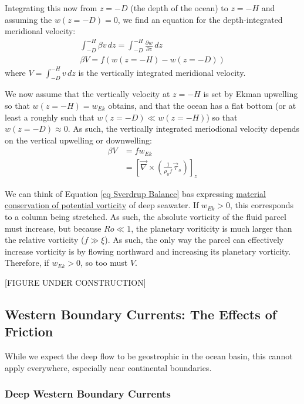 Integrating this now from \(z=-D\) (the depth of the ocean) to \(z=-H\) and assuming the \(w(z=-D)=0\), we find an equation for the depth-integrated meridional velocity:
\begin{align*}
    \int_{-D}^{-H}\beta v\,dz = \int_{-D}^{-H}\frac{\partial w}{\partial z}\,dz
    \\
    \beta V = f\left( w(z=-H)-w(z=-D) \right)
\end{align*}
where \(V=\int_{-D}^{-H} v\,dz\) is the vertically integrated meridional velocity.

We now assume that the vertically velocity at \(z=-H\) is set by Ekman upwelling so that \(w(z=-H)=w_{Ek}\) obtains, and that the ocean has a flat bottom (or at least a roughly such that \(w(z=-D)\ll w(z=-H)\)) so that \(w(z=-D)\approx 0\). As such, the vertically integrated meriodional velocity depends on the vertical upwelling or downwelling:
\begin{equation}
    \label{eq Sverdrup Balance}
    \begin{aligned}
        \beta V &= f w_{Ek}
        \\
        &=\left[
            \vec{\nabla} \times \left( \frac{1}{\rho_0 f}\vec{\tau}_s \right)
        \right]_z
    \end{aligned}
\end{equation}

We can think of Equation \ref{eq Sverdrup Balance} bas expressing \hyperref[Cons PV Box]{material conservation of potential vorticity} of deep seawater. If \(w_{Ek}>0\), this corresponds to a column being stretched. As such, the absolute vorticity of the fluid parcel must increase, but because \(Ro\ll 1\), the planetary voriticity is much larger than the relative vorticity (\(f\gg \xi\)). As such, the only way the parcel can effectively increase vorticity is by flowing northward and increasing its planetary vorticity. Therefore, if \(w_{Ek}>0\), so too must \(V\).

[FIGURE UNDER CONSTRUCTION]

\subsection{Western Boundary Currents: The Effects of Friction}

While we expect the deep flow to be geostrophic in the ocean basin, this cannot apply everywhere, especially near continental boundaries.

\subsubsection{Deep Western Boundary Currents}

